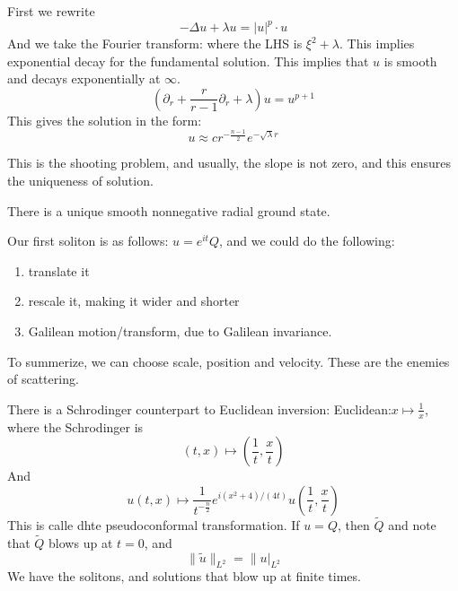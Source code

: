 First we rewrite
\begin{equation*}
    -\Delta u+\lambda u=|u|^p\cdot u
\end{equation*}
And we take the Fourier transform: where the LHS is $\xi^2+\lambda$. This implies exponential decay for the fundamental solution. This implies that $u$ is smooth and decays exponentially at $\infty$.
\begin{equation*}
    (\partial_r+\frac{r}{r-1}\partial_r+\lambda)u=u^{p+1}
\end{equation*}
This gives the solution in the form:
\begin{equation*}
    u\approx cr^{-\frac{n-1}{2}}e^{-\sqrt{\lambda}r}
\end{equation*}
\begin{note}
    This is the shooting problem, and usually, the slope is not zero, and this ensures the uniqueness of solution.
\end{note}

\begin{theorem}
    There is a unique smooth nonnegative radial ground state.
\end{theorem}

Our first soliton is as follows: $u=e^{it}Q$, and we could do the following:
\begin{enumerate}
    \item translate it
    \item rescale it, making it wider and shorter
    \item Galilean motion/transform, due to Galilean invariance. 
\end{enumerate}
To summerize, we can choose scale, position and velocity.  These are the enemies of scattering.

There is a Schrodinger counterpart to Euclidean inversion:
Euclidean:$ x\mapsto\frac{1}{x}$, where the Schrodinger is
\begin{equation*}
    (t,x)\mapsto \left(\frac{1}{t}, \frac{x}{t}\right)
\end{equation*}
And 
\begin{equation*}
    u(t,x)\mapsto \frac{1}{t^{-\frac{n}{2}}}e^{i(x^2+4)/(4t)}u(\frac{1}{t}, \frac{x}{t})
\end{equation*}
This is calle dhte pseudoconformal transformation. If $u=Q$, then $\tilde{Q}$ and note that $\tilde{Q}$ blows up at $t=0$, and 
\begin{equation*}
    \|\tilde{u}\|_{L^2}=\|u|_{L^2}
\end{equation*}
We have the solitons, and solutions that blow up at finite times. 

